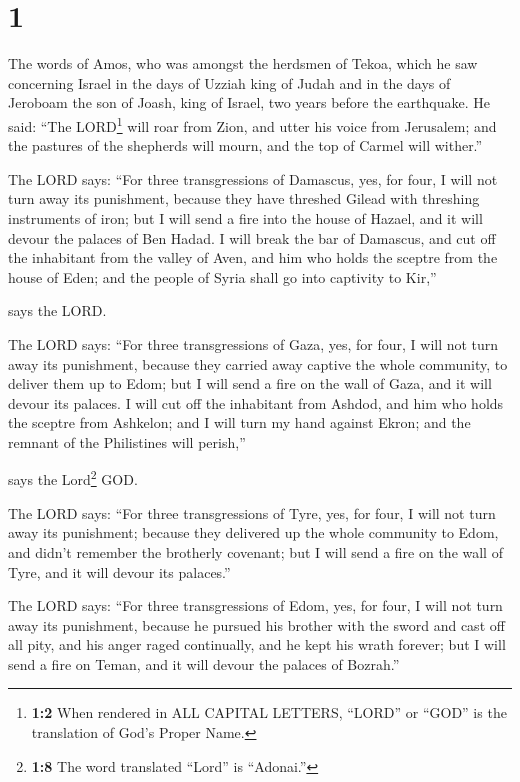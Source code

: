\hypertarget{section}{%
\section{1}\label{section}}

 The words of Amos, who was amongst the herdsmen of Tekoa,
which he saw concerning Israel in the days of Uzziah king of Judah and
in the days of Jeroboam the son of Joash, king of Israel, two years
before the earthquake.  He said: ``The LORD\footnote{\textbf{1:2}
  When rendered in ALL CAPITAL LETTERS, ``LORD'' or ``GOD'' is the
  translation of God's Proper Name.} will roar from Zion, and utter his
voice from Jerusalem; and the pastures of the shepherds will mourn, and
the top of Carmel will wither.''

 The LORD says: ``For three transgressions of Damascus,
yes, for four, I will not turn away its punishment, because they have
threshed Gilead with threshing instruments of iron;  but I
will send a fire into the house of Hazael, and it will devour the
palaces of Ben Hadad.  I will break the bar of Damascus,
and cut off the inhabitant from the valley of Aven, and him who holds
the sceptre from the house of Eden; and the people of Syria shall go
into captivity to Kir,''

says the LORD.

 The LORD says: ``For three transgressions of Gaza, yes,
for four, I will not turn away its punishment, because they carried away
captive the whole community, to deliver them up to Edom; 
but I will send a fire on the wall of Gaza, and it will devour its
palaces.  I will cut off the inhabitant from Ashdod, and
him who holds the sceptre from Ashkelon; and I will turn my hand against
Ekron; and the remnant of the Philistines will perish,''

says the Lord\footnote{\textbf{1:8} The word translated ``Lord'' is
  ``Adonai.''} GOD.

 The LORD says: ``For three transgressions of Tyre, yes,
for four, I will not turn away its punishment; because they delivered up
the whole community to Edom, and didn't remember the brotherly covenant;
 but I will send a fire on the wall of Tyre, and it will
devour its palaces.''

 The LORD says: ``For three transgressions of Edom, yes,
for four, I will not turn away its punishment, because he pursued his
brother with the sword and cast off all pity, and his anger raged
continually, and he kept his wrath forever;  but I will
send a fire on Teman, and it will devour the palaces of Bozrah.''


